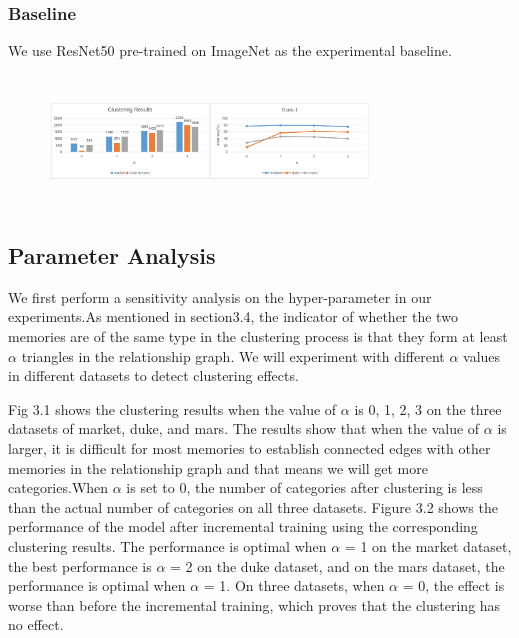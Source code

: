 \documentclass{article}
\begin{document}
\subsubsection{Baseline}
We use ResNet50 pre-trained on ImageNet as the experimental baseline.




\begin{figure}[htb]
    
    \includegraphics[width=8.5cm,height=3.5cm]{fig5_all.pdf}
    \caption{}
    \label{}
\end{figure}




\subsection{Parameter Analysis}
We first perform a sensitivity analysis on the hyper-parameter in our experiments.As mentioned in section3.4, the indicator of whether the two memories are of the same type in the clustering process is that they form at least $\alpha$ triangles in the relationship graph. We will experiment with different $\alpha$ values in different datasets to detect clustering effects.

Fig 3.1 shows the clustering results when the value of $\alpha$ is 0, 1, 2, 3 on the three datasets of market, duke, and mars. The results show that when the value of $\alpha$ is larger, it is difficult for most memories to establish connected edges with other memories in the relationship graph and that means we will get more categories.When $\alpha$ is set to 0, the number of categories after clustering is less than the actual number of categories on all three datasets. Figure 3.2 shows the performance of the model after incremental training using the corresponding clustering results. The performance is optimal when $\alpha$ = 1 on the market dataset, the best performance is $\alpha$ = 2 on the duke dataset, and on the mars dataset, the performance is optimal when $\alpha$ = 1. On three datasets, when $\alpha$ = 0, the effect is worse than before the incremental training, which proves that the clustering has no effect.
\end{document}
